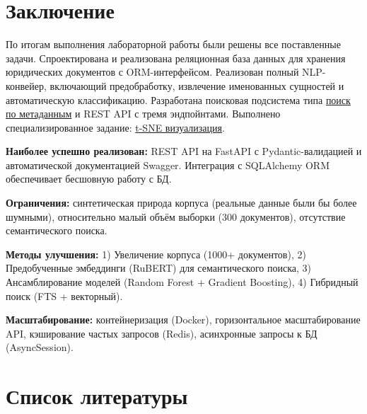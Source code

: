 \documentclass[a4paper,12pt]{article}
\begin{document}
\section{Заключение}

По итогам выполнения лабораторной работы были решены все поставленные задачи. Спроектирована и реализована реляционная база данных для хранения юридических документов с ORM-интерфейсом. Реализован полный NLP-конвейер, включающий предобработку, извлечение именованных сущностей и автоматическую классификацию. Разработана поисковая подсистема типа \underline{поиск по метаданным} и REST API с тремя эндпойнтами. Выполнено специализированное задание: \underline{t-SNE визуализация}.

\begin{infobox}
\textbf{Наиболее успешно реализован:} REST API на FastAPI с Pydantic-валидацией и автоматической документацией Swagger. Интеграция с SQLAlchemy ORM обеспечивает бесшовную работу с БД.

\textbf{Ограничения:} синтетическая природа корпуса (реальные данные были бы более шумными), относительно малый объём выборки (300 документов), отсутствие семантического поиска.

\textbf{Методы улучшения:} 1) Увеличение корпуса (1000+ документов), 2) Предобученные эмбеддинги (RuBERT) для семантического поиска, 3) Ансамблирование моделей (Random Forest + Gradient Boosting), 4) Гибридный поиск (FTS + векторный).

\textbf{Масштабирование:} контейнеризация (Docker), горизонтальное масштабирование API, кэширование частых запросов (Redis), асинхронные запросы к БД (AsyncSession).
\end{infobox}


\section*{Список литературы}
\end{document}

